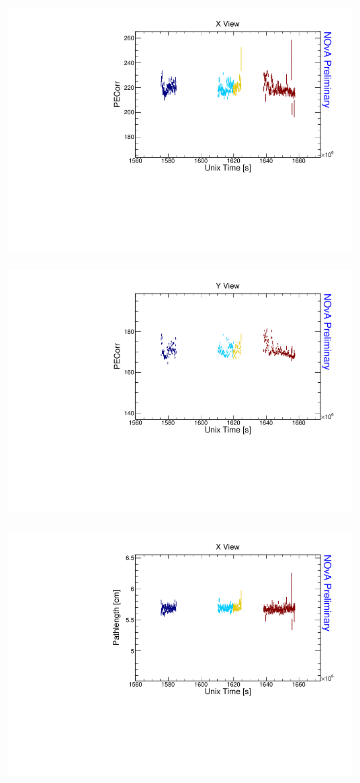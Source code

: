 \begin{figure}[!ht]
\begin{subfigure}{0.5\textwidth}
  \end{subfigure}
  \begin{subfigure}{0.5\textwidth}
    \includegraphics[width=\linewidth]{driftsec_tb/pecorr_time_x.pdf}
  \end{subfigure}
  \begin{subfigure}{0.5\textwidth}
    \includegraphics[width=\linewidth]{driftsec_tb/pecorr_time_y.pdf}
  \end{subfigure}
  \begin{subfigure}{0.5\textwidth}
    \includegraphics[width=\linewidth]{driftsec_tb/cm_time_x.pdf}

\end{subfigure}
\end{figure}
